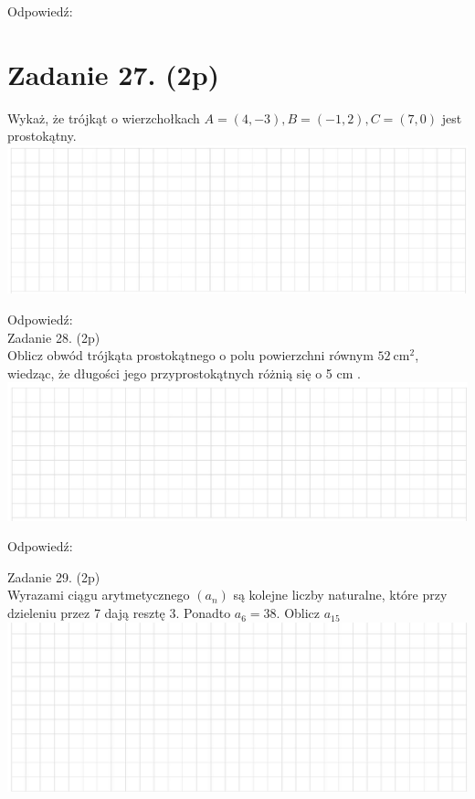 \documentclass[10pt]{article}
\begin{document}
Odpowiedź:

\section*{Zadanie 27. (2p)}
Wykaż, że trójkąt o wierzchołkach \(A=(4,-3), B=(-1,2), C=(7,0)\) jest prostokątny.\\
\includegraphics[max width=\textwidth, center]{2024_11_21_b63ac6eb3d78a57ac924g-09(1)}

Odpowiedź:\\
Zadanie 28. (2p)\\
Oblicz obwód trójkąta prostokątnego o polu powierzchni równym \(52 \mathrm{~cm}^{2}\), wiedząc, że długości jego przyprostokątnych różnią się o 5 cm .\\
\includegraphics[max width=\textwidth, center]{2024_11_21_b63ac6eb3d78a57ac924g-09(2)}

Odpowiedź:

Zadanie 29. (2p)\\
Wyrazami ciągu arytmetycznego \(\left(a_{n}\right)\) są kolejne liczby naturalne, które przy dzieleniu przez 7 dają resztę 3. Ponadto \(a_{6}=38\). Oblicz \(a_{15}\)\\
\includegraphics[max width=\textwidth, center]{2024_11_21_b63ac6eb3d78a57ac924g-10}
\end{document}
